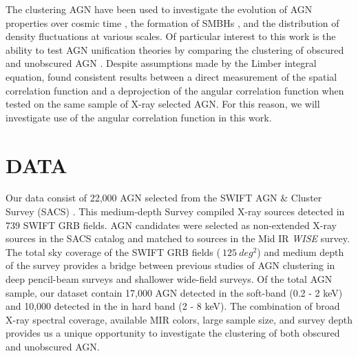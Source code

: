 \documentclass[preprint]{aastex63}
\begin{document}
The clustering AGN have been used to investigate the evolution of AGN properties over cosmic time \citep{koutoulidis_2},
the formation of SMBHs \citep{miyaji}, and the distribution of density fluctuations at various scales. Of particular interest to this work is the ability to test AGN unification theories
by comparing the clustering of obscured and unobscured AGN \citep{ebrero}. 
Despite assumptions made by the Limber integral equation, \citet{koutoulidis} found consistent results between a direct measurement of the 
spatial correlation function and a deprojection of the angular correlation function when tested on the same sample of X-ray selected AGN. 
For this reason, we will investigate use of the angular correlation function in this work. 




\section{DATA} 
   Our data consist of 22,000 AGN selected from the SWIFT AGN \& Cluster Survey (SACS) \citep{dai_2015}. This medium-depth Survey
    compiled X-ray sources detected in 739 SWIFT GRB fields. AGN candidates were selected as non-extended X-ray sources in the SACS catalog and matched
    to sources in the Mid IR \textit{WISE} survey. The  total sky coverage of the SWIFT GRB fields ($~125 \ deg^2$) and medium depth of the survey provides a bridge between previous studies of AGN clustering 
    in deep pencil-beam surveys and shallower wide-field surveys. Of the total AGN sample, our dataset contain 17,000 AGN detected in the soft-band (0.2 - 2 keV) and 
    10,000 detected in the in hard band (2 - 8 keV). The combination of broad X-ray spectral coverage, available MIR colors, large sample size, and survey depth provides us 
    a unique opportunity to investigate the clustering of both obscured and unobscured AGN.
    
\end{document}
